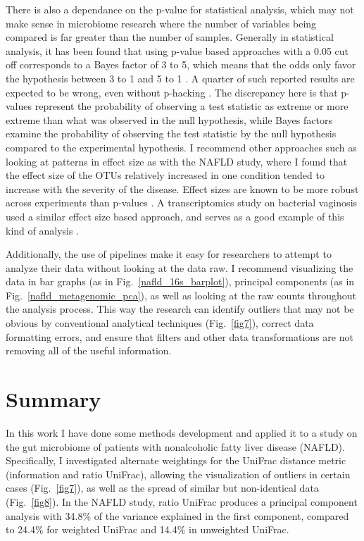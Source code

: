 There is also a dependance on the p-value for statistical analysis, which may not make sense in microbiome research where the number of variables being compared is far greater than the number of samples. Generally in statistical analysis, it has been found that using p-value based approaches with a 0.05 cut off corresponds to a Bayes factor of 3 to 5, which means that the odds only favor the hypothesis between 3 to 1 and 5 to 1 \cite{johnson2013revised}. A quarter of such reported results are expected to be wrong, even without p-hacking \cite{johnson2013revised}. The discrepancy here is that p-values represent the probability of observing a test statistic as extreme or more extreme than what was observed in the null hypothesis, while Bayes factors examine the probability of observing the test statistic by the null hypothesis compared to the experimental hypothesis. I recommend other approaches such as looking at patterns in effect size as with the NAFLD study, where I found that the effect size of the OTUs relatively increased in one condition tended to increase with the severity of the disease. Effect sizes are known to be more robust across experiments than p-values \cite{halsey2015fickle}. A transcriptomics study on bacterial vaginosis used a similar effect size based approach, and serves as a good example of this kind of analysis \cite{macklaim2013comparative}.

Additionally, the use of pipelines make it easy for researchers to attempt to analyze their data without looking at the data raw. I recommend visualizing the data in bar graphs (as in Fig.~\ref{nafld_16s_barplot}), principal components (as in Fig.~\ref{nafld_metagenomic_pca}), as well as looking at the raw counts throughout the analysis process. This way the research can identify outliers that may not be obvious by conventional analytical techniques (Fig.~\ref{fig7}), correct data formatting errors, and ensure that filters and other data transformations are not removing all of the useful information.

\section{Summary}

In this work I have done some methods development and applied it to a study on the gut microbiome of patients with nonalcoholic fatty liver disease (NAFLD). Specifically, I investigated alternate weightings for the UniFrac distance metric (information and ratio UniFrac), allowing the visualization of outliers in certain cases (Fig.~\ref{fig7}), as well as the spread of similar but non-identical data (Fig.~\ref{fig8}). In the NAFLD study, ratio UniFrac produces a principal component analysis with 34.8\% of the variance explained in the first component, compared to 24.4\% for weighted UniFrac and 14.4\% in unweighted UniFrac.

